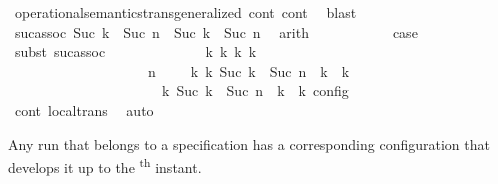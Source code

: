 \begin{isabellebody}
\ operational{\isacharunderscore}semantics{\isacharunderscore}trans{\isacharunderscore}generalized\ cont\ cont{}\ \isamarkupfalse%
\ blast\isanewline
\ \ \ \ \ \ \ \ \isamarkupfalse%
\ \isamarkupfalse%
\ suc{\isacharunderscore}assoc{\isacharcolon}\ {\isacartoucheopen}Suc\ {\isasymdelta}k\ {\isacharplus}\ Suc\ n\ {\isacharequal}\ Suc\ {\isacharparenleft}{\isasymdelta}k\ {\isacharplus}\ Suc\ n{\isacharparenright}{\isacartoucheclose}\ \isamarkupfalse%
\ arith\isanewline
\ \ \ \ \ \ \ \ \isamarkupfalse%
\ \isamarkupfalse%
\ {\isacharquery}case\isanewline
\ \ \ \ \ \ \ \ \ \ \isamarkupfalse%
\ {\isacharparenleft}subst\ suc{\isacharunderscore}assoc{\isacharparenright}\isanewline
\ \ \ \ \ \ \ \ \ \ \ \ \isamarkupfalse%
\ {\isacartoucheopen}{\isasymexists}{\isasymGamma}\isactrlsub k\ {\isasymPsi}\isactrlsub k\ {\isasymPhi}\isactrlsub k\ k{\isachardot}\isanewline
\ \ \ \ \ \ \ \ \ \ \ \ \ \ \ \ \ \ \ {\isacharparenleft}{\isacharparenleft}{\isasymGamma}{\isacharcomma}\ n\ {\isasymturnstile}\ {\isasymPsi}\ {\isasymtriangleright}\ {\isasymPhi}{\isacharparenright}\ {\isasymhookrightarrow}\isactrlbsup k\isactrlesup \ {\isacharparenleft}{\isasymGamma}\isactrlsub k{\isacharcomma}\ Suc\ {\isacharparenleft}{\isasymdelta}k\ {\isacharplus}\ Suc\ n{\isacharparenright}\ {\isasymturnstile}\ {\isasymPsi}\isactrlsub k\ {\isasymtriangleright}\ {\isasymPhi}\isactrlsub k{\isacharparenright}{\isacharparenright}\isanewline
\ \ \ \ \ \ \ \ \ \ \ \ \ \ \ \ \ \ {\isasymand}\ {\isasymrho}\ {\isasymin}\ {\isasymlbrakk}\ {\isasymGamma}\isactrlsub k{\isacharcomma}\ Suc\ {\isasymdelta}k\ {\isacharplus}\ Suc\ n\ {\isasymturnstile}\ {\isasymPsi}\isactrlsub k\ {\isasymtriangleright}\ {\isasymPhi}\isactrlsub k\ {\isasymrbrakk}\isactrlsub c\isactrlsub o\isactrlsub n\isactrlsub f\isactrlsub i\isactrlsub g{\isacartoucheclose}\isanewline
\ \ \ \ \ \ \ \ \ \ \ \ \isamarkupfalse%
\ cont{}\ local{\isachardot}trans\ \isamarkupfalse%
\ auto\isanewline
\ \ \ \ \ \ \ \ \ \ \isamarkupfalse%
\isanewline
\ \ \ \ \isamarkupfalse%
\isanewline
{}\isamarkupfalse%
%
\endisatagproof
{\isafoldproof}%
%
\isadelimproof
%
\endisadelimproof
%
\begin{isamarkuptext}%
Any run that belongs to a specification \isa{{\isasymPsi}} has a corresponding 
  configuration that develops it up to the \textsuperscript{th} instant.%
\end{isamarkuptext}\isamarkuptrue%

\end{isabellebody}
